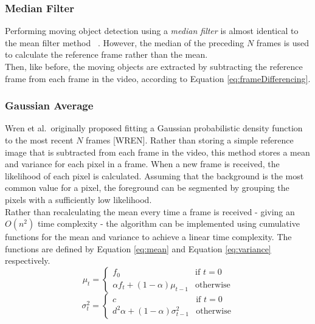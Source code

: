 \setlength{\leftskip}{0cm}
\subsubsection{Median Filter}
\setlength{\leftskip}{0.5cm}
\indent \indent
Performing moving object detection using a \textit{median filter} is almost identical to the mean filter method ~\cite{MeanFilter}. However, the median of the preceding $N$ frames is used to calculate the reference frame rather than the mean.
\smallskip \\ \indent
Then, like before, the moving objects are extracted by subtracting the reference frame from each frame in the video, according to Equation \ref{eq:frameDifferencing}.

\setlength{\leftskip}{0cm}
\subsubsection{Gaussian Average}
\label{sec:gaussianAverage}
\setlength{\leftskip}{0.5cm}
\indent \indent
Wren et al.\ originally proposed fitting a Gaussian probabilistic density function to the most recent $N$ frames [WREN]. Rather than storing a simple reference image that is subtracted from each frame in the video, this method stores a mean and variance for each pixel in a frame. When a new frame is received, the likelihood of each pixel is calculated. Assuming that the background is the most common value for a pixel, the foreground can be segmented by grouping the pixels with a sufficiently low likelihood.
\smallskip \\ \indent
Rather than recalculating the mean every time a frame is received - giving an $O(n^2)$ time complexity - the algorithm can be implemented using cumulative functions for the mean and variance to achieve a linear time complexity. The functions are defined by Equation \ref{eq:mean} and Equation \ref{eq:variance} respectively. 
\begin{equation}
    \label{eq:mean}
    \mu_t =
    \begin{cases}
        f_0 & \text{if $t = 0$} \\
        \alpha f_t + (1 - \alpha) \mu_{t-1} & \text{otherwise}
    \end{cases}
\end{equation}
\begin{equation}
    \label{eq:variance}
    \sigma^2_t =
    \begin{cases}
        c & \text{if $t = 0$} \\
        d^2 \alpha + (1 - \alpha) \sigma^2_{t-1} & \text{otherwise}
    \end{cases}
\end{equation}

